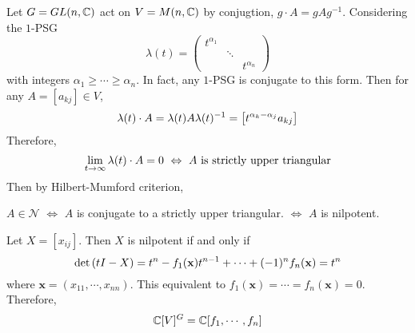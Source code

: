 \documentclass[a4paper,12pt]{article}
\begin{document}
	\begin{exam}
		Let $G=GL(n,\mathbb{C})$ act on $V = M(n,\mathbb{C})$ by conjugtion, $g \cdot A = gAg^{-1}$. Considering the $1$-PSG
		\begin{equation*}
			\lambda(t) = \left(
			    \begin{array}{ccc}
			      t^{\alpha_1} & & \\
			      & \ddots &\\
			      &&t^{\alpha_n}
			    \end{array}
			  \right)
		\end{equation*}
		with integers $\alpha_1 \geqslant \cdots \geqslant \alpha_n$. In fact, any $1$-PSG is conjugate to this form. Then for any $A=[a_{kj}] \in V$,
		\begin{equation*}
			\lambda(t) \cdot A = \lambda(t)A\lambda(t)^{-1} = \left[t^{\alpha_k-\alpha_j}a_{kj}\right]
		\end{equation*}
		Therefore,
		\begin{equation*}
			\lim_{t \rightarrow \infty} \lambda(t) \cdot A = 0~\Leftrightarrow~A \text{ is strictly upper triangular}
		\end{equation*}
		Then by Hilbert-Mumford criterion,
		\begin{center}
			$A \in \mathcal{N}$ $\Leftrightarrow$ $A$ is conjugate to a strictly upper triangular. $\Leftrightarrow$ $A$ is nilpotent.
		\end{center}
		Let $X=[x_{ij}]$. Then $X$ is nilpotent if and only if
		\begin{equation*}
			\det\left(tI-X\right) = t^n - f_1(\mathbf{x})t^{n-1}+\cdots+(-1)^nf_n(\mathbf{x}) = t^n
		\end{equation*}
		where $\mathbf{x} = (x_{11},\cdots,x_{nn})$. This equivalent to $f_1(\mathbf{x})=\cdots=f_n(\mathbf{x}) =0$. Therefore,
		\begin{equation*}
			\mathbb{C}[V]^G = \mathbb{C}[f_1,\cdots,f_n]
		\end{equation*}
	\end{exam}
\end{document}
